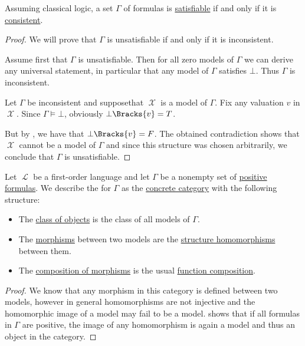 \begin{proposition}\label{thm:formulas_satisfiable_iff_consistent}
  Assuming classical logic, a set \( \Gamma \) of formulas is \hyperref[def:propositional_semantics/satisfiability]{satisfiable} if and only if it is \hyperref[def:first_order_theory/consistent]{consistent}.
\end{proposition}
\begin{proof}
  We will prove that \( \Gamma \) is unsatisfiable if and only if it is inconsistent\DNE.

  \SufficiencySubProof Assume first that \( \Gamma \) is unsatisfiable. Then for all zero models of \( \Gamma \) we can derive any universal statement, in particular that any model of \( \Gamma \) satisfies \( \bot \). Thus \( \Gamma \) is inconsistent.

  \NecessitySubProof Let \( \Gamma \) be inconsistent and suppose\DNE that \( \mscrX \) is a model of \( \Gamma \). Fix any valuation \( v \) in \( \mscrX \). Since \( \Gamma \vDash \bot \), obviously \( \bot\Bracks{v} = T \).

  But by , we have that \( \bot\Bracks{v} = F \). The obtained contradiction shows that \( \mscrX \) cannot be a model of \( \Gamma \) and since this structure was chosen arbitrarily, we conclude that \( \Gamma \) is unsatisfiable.
\end{proof}

\begin{definition}\label{def:category_of_first_order_models}
  Let \( \mscrL \) be a first-order language and let \( \Gamma \) be a nonempty set of \hyperref[def:positive_formula]{positive formulas}. We describe the  for \( \Gamma \) as the \hyperref[def:concrete_category]{concrete category} with the following structure:
  \begin{itemize}
    \item The \hyperref[def:category/C1]{class of objects} is the class of all models of \( \Gamma \).

    \item The \hyperref[def:category/C2]{morphisms} between two models are the \hyperref[def:first_order_homomorphism]{structure homomorphisms} between them.

    \item The \hyperref[def:category/C3]{composition of morphisms} is the usual \hyperref[def:function/composition]{function composition}.
  \end{itemize}
\end{definition}
\begin{proof}
  We know that any morphism in this category is defined between two models, however in general homomorphisms are not injective and the homomorphic image of a model may fail to be a model.  shows that if all formulas in \( \Gamma \) are positive, the image of any homomorphism is again a model and thus an object in the category.
\end{proof}

